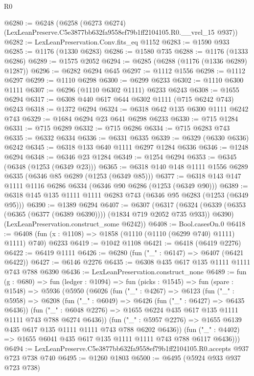 \begin{lexlean}{R0}
\begin{coremodule}
@6280 := @6248
    (@6258 (@6273 @6274) (LexLeanPreserve.C5e3877bb632fa9558ef79b1ff2104105.R0.__vrel_15 @937))
@6282 := LexLeanPreservation.Conv.fits_eq @1152
@6283 := @1590 @933
@6285 := @1176 (@1330 @6283)
@6286 := @1580 @735
@6288 := @1176 (@1333 @6286)
@6289 := @1575 @2052
@6294 := @6285 (@6288 (@1176 (@1336 @6289) @1287))
@6296 := @6282 @6294 @645
@6297 := @1112 @1556
@6298 := @1112 @6297
@6299 := @1110 @6298
@6300 := @6299 @6233
@6302 := @1110 @6300 @1111
@6307 := @6296 (@1110 @6302 @1111) @6233 @6243
@6308 := @1655 @6294
@6317 := @6308 @440 @617 @644 @6302 @1111 (@715 @6242 @743) @6243
@6318 := @1372 @6294
@6324 := @6318 @642 @135 @6300 @1111 @6242 @743
@6329 := @1684 @6294 @23 @641 @6298 @6233
@6330 := @715 @1284
@6331 := @715 @6289
@6332 := @715 @6286
@6334 := @715 @6283 @743
@6335 := @6332 @6334
@6336 := @6331 @6335
@6339 := @6329 (@6330 @6336) @6242
@6345 := @6318 @133 @640 @1111 @6297 @1284 @6336
@6346 := @1248 @6294
@6348 := @6346 @23 @1284
@6349 := @1254 @6294
@6353 := @6345 (@6348 (@1253 (@6349 @23)))
@6365 := @6318 @140 @148 @1111 @1556 @6289 @6335 (@6346 @85 @6289 (@1253 (@6349 @85)))
@6377 := @6318 @143 @147 @1111 @1116 @6286 @6334 (@6346 @90 @6286 (@1253 (@6349 @90)))
@6389 := @6318 @145 @135 @1111 @1111 @6283 @743 (@6346 @95 @6283 (@1253 (@6349 @95)))
@6390 := @1389 @6294
@6407 := @6307
    (@6317
      (@6324 (@6339 (@6353 (@6365 (@6377 (@6389 @6390)))) (@1834 @719 @2052 @735 @933)) @6390)
      (LexLeanPreservation.construct_some @6242))
@6408 := Bool.casesOn.{0}
@6418 := @6408 (fun (x : @1108) => @1858 (@1110 (@1110 (@6299 @740) @1111) @1111) @740) @6233
@6419 := @1042 @1108
@6421 := @6418 (@6419 @2276)
@6422 := @6419 @1111
@6426 := @6280 (fun ("_" : @6147) => @6407 (@6421 @6422))
@6427 := @6146 @2276
@6435 := @6308 @435 @617 @135 @1111 @1111 @743 @788 @6390
@6436 := LexLeanPreservation.construct_none
@6489 := fun (g : @680) =>
  fun (ledger : @1094) =>
  fun (picks : @1545) =>
  fun (spare : @1548) =>
  @5936
    (@5950
      (@6026
        (fun ("_" : @4267) =>
        @6123
          (fun ("_" : @5958) =>
          @6208
            (fun ("_" : @6049) => @6426 (fun ("_" : @6427) => @6435 @6436))
            (fun ("_" : @6048 @2276) =>
            @1655 @6224 @435 @617 @135 @1111 @1111 @743 @788 @6274 @6436))
          (fun ("_" : @5957 @2276) => @1655 @6139 @435 @617 @135 @1111 @1111 @743 @788 @6202 @6436))
        (fun ("_" : @4402) => @1655 @6041 @435 @617 @135 @1111 @1111 @743 @788 @6117 @6436)))
@6494 := LexLeanPreserve.C5e3877bb632fa9558ef79b1ff2104105.R0.accepts @937 @723 @738 @740
@6495 := @1260 @1803
@6500 := @6495 (@5924 @933 @937 @723 @738)

\end{coremodule}
\end{lexlean}
